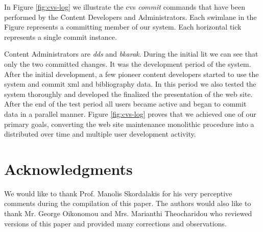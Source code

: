 \documentclass{elsart}
\begin{document}
In Figure \ref{fig:cvs-log} we illustrate the {\sc cvs} \textit{commit} commands that have been performed by
the Content Developers and Administrators. Each swimlane in the Figure represents a committing
member of our system. Each horizontal tick represents a single commit instance.

Content Administrators are \textit{dds} and \textit{bkarak}. 
During the initial lit we can see that only the two committed 
changes. It was the development period of the system. After the initial development, a few 
pioneer content developers started to use the system and commit {\sc xml} and bibliography data. In this period 
we also tested the system thoroughly and developed the finalized the presentation of the web site. After the end of
the test period all users became active and began to commit data in a parallel manner. Figure \ref{fig:cvs-log} 
proves that we achieved one of our primary goals, converting the web site maintenance monolithic procedure 
into a distributed over time and multiple user development activity.

\section{Acknowledgments}
\label{sec:ack}

We would like to thank Prof. Manolis Skordalakis for his very perceptive comments during the compilation of this paper.
The authors would also like to thank Mr. George Oikonomou and Mrs. Marianthi Theocharidou who reviewed versions 
of this paper and provided many corrections and observations.



\end{document}
